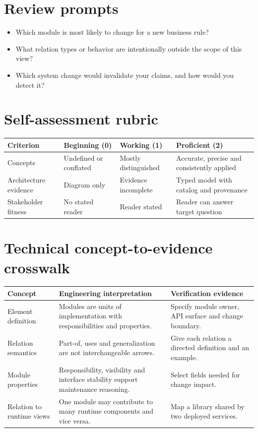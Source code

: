 \documentclass[10pt,letterpaper]{article}
\begin{document}
\section{Review prompts}
\begin{itemize}
\item Which module is most likely to change for a new business rule?
\item What relation types or behavior are intentionally outside the scope of this view?
\item Which system change would invalidate your claims, and how would you detect it?
\end{itemize}
\section{Self-assessment rubric}
\small
\begin{tabularx}{\linewidth}{@{}YYYY@{}}
\toprule
\textbf{Criterion} & \textbf{Beginning (0)} & \textbf{Working (1)} & \textbf{Proficient (2)} \\
\midrule
Concepts & Undefined or conflated & Mostly distinguished & Accurate, precise and consistently applied \\
Architecture evidence & Diagram only & Evidence incomplete & Typed model with catalog and provenance \\
Stakeholder fitness & No stated reader & Reader stated & Reader can answer target question \\
\bottomrule
\end{tabularx}
\normalsize
\section{Technical concept-to-evidence crosswalk}
\small
\begin{tabularx}{\linewidth}{@{}YYY@{}}
\toprule
\textbf{Concept} & \textbf{Engineering interpretation} & \textbf{Verification evidence} \\
\midrule
Element definition & Modules are units of implementation with responsibilities and properties. & Specify module owner, API surface and change boundary. \\
Relation semantics & Part-of, uses and generalization are not interchangeable arrows. & Give each relation a directed definition and an example. \\
Module properties & Responsibility, visibility and interface stability support maintenance reasoning. & Select fields needed for change impact. \\
Relation to runtime views & One module may contribute to many runtime components and vice versa. & Map a library shared by two deployed services. \\
\bottomrule
\end{tabularx}
\normalsize
\end{document}
